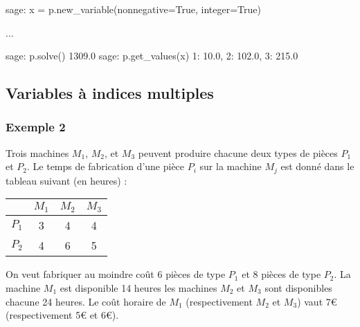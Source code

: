 \documentclass[french]{beamer}
\begin{document}
\begin{frame}[fragile]
\begin{pythoncode}
sage: x = p.new_variable(nonnegative=True, integer=True)

...

sage: p.solve()
1309.0
sage: p.get_values(x)
{1: 10.0, 2: 102.0, 3: 215.0}
\end{pythoncode}


\end{frame}



\subsection{Variables à indices multiples}


\begin{frame}\frametitle{Exemple 2}

  Trois machines $M_1$, $M_2$, et $M_3$ peuvent  produire chacune deux types de pièces $P_1$
  et $P_2$. Le temps de fabrication d’une pièce $P_i$ sur la machine $M_j$ est donné dans
  le tableau suivant (en heures) :

\begin{center}  
\begin{tabular}{|c|c|c|c|}
 \cline{2-4}
     \multicolumn{1}{c|}{}
  &$M_1$&$M_2$&$M_3$ \\
\hline
 $P_1$ &3&4&4 \\
\hline
 $P_2$ &4&6&5 \\
\hline
\end{tabular}
\end{center}
\pause

On veut fabriquer au moindre coût 6 pièces de type $P_1$ et 8 pièces de type $P_2$. La
machine  $M_1$ est  disponible 14  heures les  machines $M_2$  et $M_3$  sont disponibles
chacune 24  heures. Le  coût horaire  de $M_1$  (respectivement $M_2$  et $M_3$)  vaut 7€
(respectivement 5€ et 6€). 


\end{frame}
\end{document}
